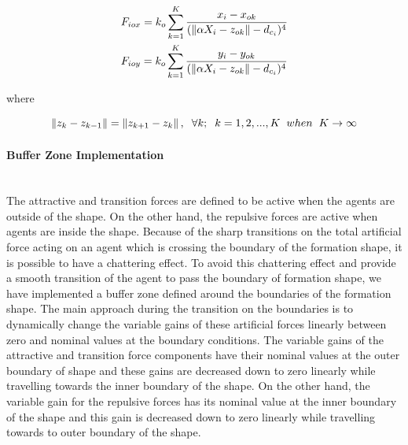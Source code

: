 \begin{align}
\begin{split}
& F_{iox} = k_o   \sum_{k=1}^{K} \frac{x_i -x_{ok}}{(\left\lVert\alpha X_i - z_{ok}\right\rVert -d_{c_i})^4}\\
& F_{ioy} = k_o   \sum_{k=1}^{K} \frac{y_i - y_{ok}}{(\left\lVert\alpha X_i - z_{ok}\right\rVert -d_{c_i})^4}\\
\end{split}
\end{align}
			
where

\begin{equation}
\left\lVert z_k - z_{k-1}\right\rVert = \left\lVert z_{k+1} - z_k\right\rVert, \hspace{0.2cm}  \forall k ;  \hspace{0.2cm} k=1,2,...,K \hspace{0.2cm} when  \hspace{0.2cm} K \to\infty					
\end{equation}
			
\paragraph{Buffer Zone Implementation}\hspace{0pt} \\
The attractive and transition forces are defined to be active when the agents are outside of the shape. On the other hand, the repulsive forces are active when agents are inside the shape. Because of the sharp transitions on the total artificial force acting on an agent which is crossing the boundary of the formation shape, it is possible to have a chattering effect. To avoid this chattering effect and provide a smooth transition of the agent to pass the boundary of formation shape, we have implemented a buffer zone defined around the boundaries of the formation shape. The main approach during the transition on the boundaries is to dynamically change the variable gains of these artificial forces linearly between zero and nominal values at the boundary conditions. The variable gains of the attractive and transition force components have their nominal values at the outer boundary of shape and these gains are decreased down to zero linearly while travelling towards the inner boundary of the shape. On the other hand, the variable gain for the repulsive forces has its nominal value at the inner boundary of the shape and this gain is decreased down to zero linearly while travelling towards to outer boundary of the shape.
     
